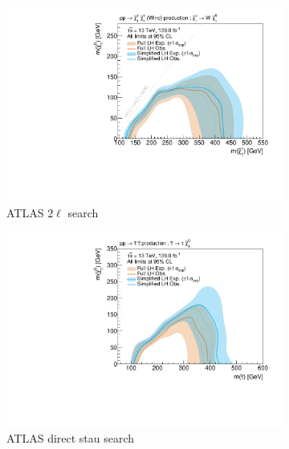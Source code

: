 \begin{figure}
\begin{subfigure}[b]{0.5\textwidth}
		\centering\includegraphics[width=\textwidth]{exclusion_2L0J_noLabel_v2}
		\caption{ATLAS $2\ell$ search~\cite{SUSY-2018-32}\label{fig:results_2L0J}}
	\end{subfigure}\hfill
	\begin{subfigure}[b]{0.5\textwidth}
		\centering\includegraphics[width=\textwidth]{exclusion_directstaus_noLabel_v2}
		\caption{ATLAS direct stau search~\cite{SUSY-2018-04}\label{fig:results_directstaus}}
	\end{subfigure}\hfill
	\par\medskip
	\begin{subfigure}[b]{0.5\textwidth}

\end{subfigure}
\end{figure}
